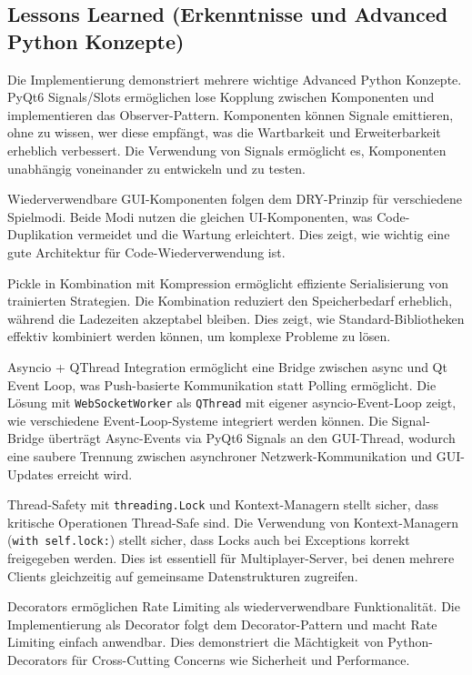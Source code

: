 \subsection{Lessons Learned (Erkenntnisse und Advanced Python Konzepte)}

Die Implementierung demonstriert mehrere wichtige Advanced Python Konzepte.
PyQt6 Signals/Slots ermöglichen lose Kopplung zwischen Komponenten und implementieren das Observer-Pattern.
Komponenten können Signale emittieren, ohne zu wissen, wer diese empfängt, was die Wartbarkeit und Erweiterbarkeit erheblich verbessert.
Die Verwendung von Signals ermöglicht es, Komponenten unabhängig voneinander zu entwickeln und zu testen.

Wiederverwendbare GUI-Komponenten folgen dem DRY-Prinzip für verschiedene Spielmodi.
Beide Modi nutzen die gleichen UI-Komponenten, was Code-Duplikation vermeidet und die Wartung erleichtert.
Dies zeigt, wie wichtig eine gute Architektur für Code-Wiederverwendung ist.

Pickle in Kombination mit Kompression ermöglicht effiziente Serialisierung von trainierten Strategien.
Die Kombination reduziert den Speicherbedarf erheblich, während die Ladezeiten akzeptabel bleiben.
Dies zeigt, wie Standard-Bibliotheken effektiv kombiniert werden können, um komplexe Probleme zu lösen.

Asyncio + QThread Integration ermöglicht eine Bridge zwischen async und Qt Event Loop, was Push-basierte Kommunikation statt Polling ermöglicht.
Die Lösung mit \texttt{WebSocketWorker} als \texttt{QThread} mit eigener asyncio-Event-Loop zeigt, wie verschiedene Event-Loop-Systeme integriert werden können.
Die Signal-Bridge überträgt Async-Events via PyQt6 Signals an den GUI-Thread, wodurch eine saubere Trennung zwischen asynchroner Netzwerk-Kommunikation und GUI-Updates erreicht wird.

Thread-Safety mit \texttt{threading.Lock} und Kontext-Managern stellt sicher, dass kritische Operationen Thread-Safe sind.
Die Verwendung von Kontext-Managern (\texttt{with self.lock:}) stellt sicher, dass Locks auch bei Exceptions korrekt freigegeben werden.
Dies ist essentiell für Multiplayer-Server, bei denen mehrere Clients gleichzeitig auf gemeinsame Datenstrukturen zugreifen.

Decorators ermöglichen Rate Limiting als wiederverwendbare Funktionalität.
Die Implementierung als Decorator folgt dem Decorator-Pattern und macht Rate Limiting einfach anwendbar.
Dies demonstriert die Mächtigkeit von Python-Decorators für Cross-Cutting Concerns wie Sicherheit und Performance.

